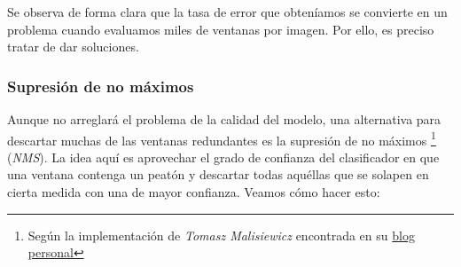 \documentclass[11pt,a4paper]{article}
\begin{document}
            \begin{figure}[H]

                \begin{center}

                    \setlength{\fboxrule}{0pt}

				\end{center}

			\end{figure}

            \par
            Se observa de forma clara que la tasa de error que obteníamos se convierte en un problema cuando evaluamos miles de ventanas por imagen. Por ello, es preciso tratar de dar soluciones.

            \subsubsection{Supresión de no máximos}

                \par
                Aunque no arreglará el problema de la calidad del modelo, una alternativa para descartar muchas de las ventanas redundantes es la supresión de no máximos \footnote{Según la implementación de \textit{Tomasz Malisiewicz} encontrada en su \href{http://www.computervisionblog.com/2011/08/blazing-fast-nmsm-from-exemplar-svm.html}{blog personal}} (\textit{NMS}). La idea aquí es aprovechar el grado de confianza del clasificador en que una ventana contenga un peatón y descartar todas aquéllas que se solapen en cierta medida con una de mayor confianza. Veamos cómo hacer esto:
\end{document}
